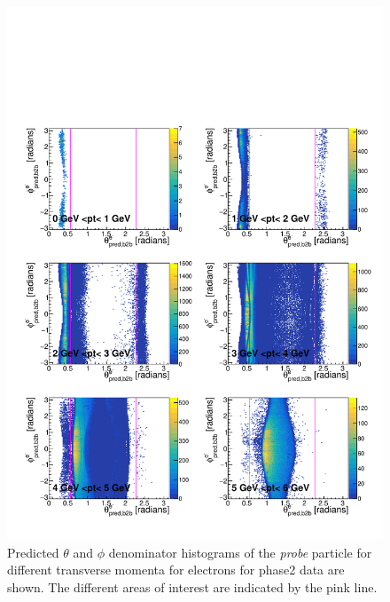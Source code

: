 \documentclass[a4paper,11pt,twosided,final,german,openbib,pdftex,listof=totoc,bibliography=totoc]{scrbook}
\begin{document}
\begin{appendix}
\begin{figure}[h!]
	\includegraphics[width=\textwidth]{Plots/master/RTPtMemE_Data.pdf}
	\caption[Enumerator $\theta$-$\phi$ Electron Transverse Momentum Phase2 Data]{Predicted $\theta$ and $\phi$ denominator histograms of the \textit{probe} particle for different transverse momenta for electrons for phase2 data are shown. The different areas of interest are indicated by the pink line.}
	\label{plt:RTPtMemE_Data}
\end{figure}



\end{appendix}
\end{document}
